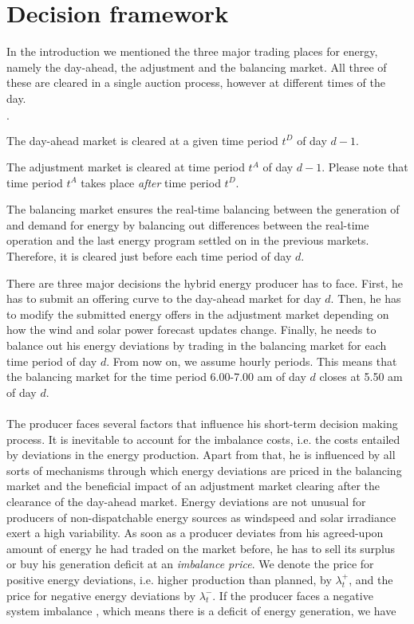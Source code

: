 \section{Decision framework}
In the introduction we mentioned the three major trading places for energy, namely the day-ahead, the adjustment and the balancing market. All three of these are cleared in a single auction process, however at different times of the day. 

\begin{list}{$\cdot$}{}
	\item The day-ahead market is cleared at a given time period $t^D$ of day $d-1$.
	\item The adjustment market is cleared at time period $t^{A}$ of day $d-1$. Please note that time period $t^{A}$ takes place \textit{after} time period $t^{D}$.
	\item The balancing market ensures the real-time balancing between the generation of and demand for energy by balancing out differences between the real-time operation and the last energy program settled on in the previous markets. Therefore, it is cleared just before each time period of day $d$. 
\end{list}
There are three major decisions the hybrid energy producer has to face. First, he has to submit an offering curve to the day-ahead market for day $d$.  Then, he has to modify the submitted energy offers in the adjustment market depending on how the wind and solar power forecast updates change.  Finally, he needs to balance out his energy deviations by trading in the balancing market for each time period of day $d$. From now on, we assume hourly periods. This means that the balancing market for the time period 6.00-7.00 am of day $d$ closes at 5.50 am of day $d$. 
\\
\\ The producer faces several factors that influence his short-term decision making process. It is inevitable to account for the imbalance costs, i.e. the costs entailed by deviations in the energy production. Apart from that, he is influenced by all sorts of mechanisms through which energy deviations are priced in the balancing market and the beneficial impact of an adjustment market clearing after the clearance of the day-ahead market. Energy deviations are not unusual for producers of non-dispatchable energy sources as windspeed and solar irradiance exert a high variability. As soon as a producer deviates from his agreed-upon amount of energy he had traded on the market before, he has to sell its surplus or buy his generation deficit at an \textit{imbalance price}. We denote the price for positive energy deviations, i.e. higher production than planned, by $\lambda_{t}^{+}$, and the price for negative energy deviations by $\lambda_{t}^{-}$.  If the producer faces a negative system imbalance , which means there is a deficit of energy generation, we have

